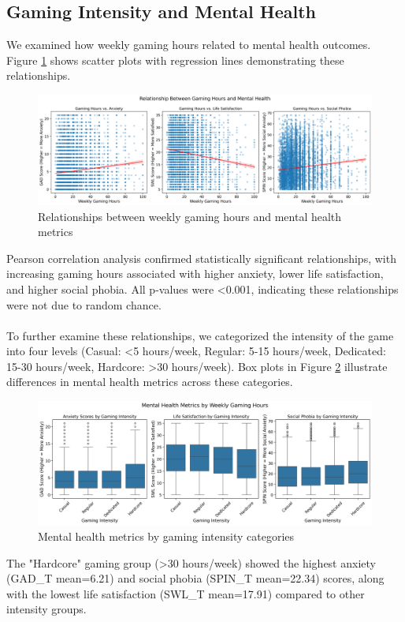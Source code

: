 \documentclass[12pt]{article}
\begin{document}
\subsection{Gaming Intensity and Mental Health}

We examined how weekly gaming hours related to mental health outcomes. Figure \ref{fig:gaming_hours} shows scatter plots with regression lines demonstrating these relationships.

\begin{figure}[H]
\centering
\includegraphics[width=\textwidth]{gaming_hours_vs_mental_health.png}
\caption{Relationships between weekly gaming hours and mental health metrics}
\label{fig:gaming_hours}
\end{figure}
\noindent
Pearson correlation analysis confirmed statistically significant relationships, with increasing gaming hours associated with higher anxiety, lower life satisfaction, and higher social phobia. All p-values were \textless 0.001, indicating these relationships were not due to random chance. \\
\\
To further examine these relationships, we categorized the intensity of the game into four levels (Casual: \textless 5 hours/week, Regular: 5-15 hours/week, Dedicated: 15-30 hours/week, Hardcore: \textgreater 30 hours/week). Box plots in Figure \ref{fig:gaming_intensity} illustrate differences in mental health metrics across these categories.

\begin{figure}[H]
\centering
\includegraphics[width=\textwidth]{mental_health_by_gaming_intensity.png}
\caption{Mental health metrics by gaming intensity categories}
\label{fig:gaming_intensity}
\end{figure}
\noindent
The "Hardcore" gaming group (\textgreater 30 hours/week) showed the highest anxiety (GAD\_T mean=6.21) and social phobia (SPIN\_T mean=22.34) scores, along with the lowest life satisfaction (SWL\_T mean=17.91) compared to other intensity groups.
\end{document}
